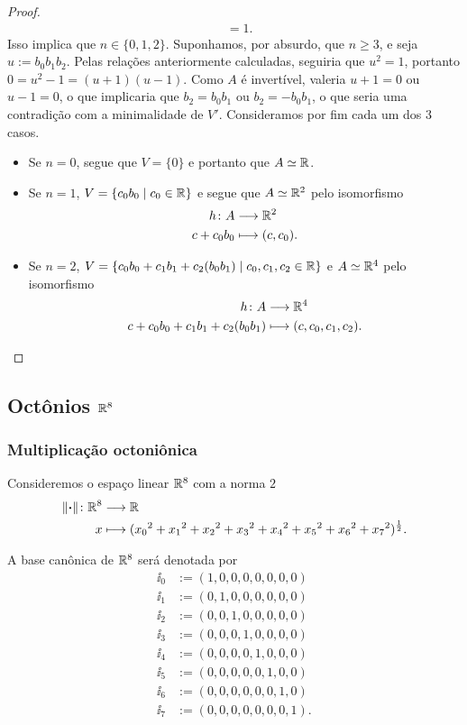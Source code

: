 \begin{proof}
\begin{align*}
		&= 1.
	\end{align*}
Isso implica que $n \in \{0,1,2\}$. Suponhamos, por absurdo, que $n\geq 3$, e seja $u := b_0b_1b_2$. Pelas relações anteriormente calculadas, seguiria que $u^2 = 1$, portanto $0 = u^2 - 1 = (u+1)(u-1)$. Como $A$ é invertível, valeria $u+1=0$ ou $u-1=0$, o que implicaria que $b_2=b_0b_1$ ou $b_2=-b_0b_1$, o que seria uma contradição com a minimalidade de $V'$.
Consideramos por fim cada um dos 3 casos.
\begin{itemize}
	\item Se $n=0$, segue que $V=\{0\}$ e portanto que $A \simeq \mathbb{R}$.
	\item Se $n=1$, $V=\left\{{c_0b_0}\;\middle\vert\;{c_0 \in \mathbb{R}}\right\}$ e segue que $A \simeq \mathbb{R}^2$ pelo isomorfismo
		\begin{align*}
		{h}\colon {A} &\longrightarrow {\mathbb{R}^2} \\{c+c_0b_0} &\longmapsto (c,c_0).
		\end{align*}
	\item Se $n=2$, $V=\left\{{c_0b_0 + c_1b_1 + c_2(b_0b_1)}\;\middle\vert\;{c_0,c_1,c_2 \in \mathbb{R}}\right\}$ e $A \simeq \mathbb{R}^4$ pelo isomorfismo
		\begin{align*}
		{h}\colon {A} &\longrightarrow {\mathbb{R}^4} \\{c+c_0b_0 + c_1b_1 + c_2(b_0b_1)} &\longmapsto (c,c_0,c_1,c_2).
		\end{align*}
\end{itemize}
\end{proof}





\subsection{Octônios \texorpdfstring{$\mathbb{R}^8$}{}}

\subsubsection{Multiplicação octoniônica}

Consideremos o espaço linear $\mathbb{R}^8$ com a norma $2$
	\begin{align*}
	{\left\Vert{\bm{\cdot}}\right\Vert}\colon {\mathbb{R}^8} &\longrightarrow {\mathbb{R}} \\{x} &\longmapsto ({x_0}^2+{x_1}^2+{x_2}^2+{x_3}^2+{x_4}^2+{x_5}^2+{x_6}^2+{x_7}^2)^{\frac{1}{2}}.
	\end{align*}

A base canônica de $\mathbb{R}^8$ será denotada por
	\begin{align*}
	\ii_0 &:= (1,0,0,0,0,0,0,0) \\
	\ii_1 &:= (0,1,0,0,0,0,0,0) \\
	\ii_2 &:= (0,0,1,0,0,0,0,0) \\
	\ii_3 &:= (0,0,0,1,0,0,0,0) \\
	\ii_4 &:= (0,0,0,0,1,0,0,0) \\
	\ii_5 &:= (0,0,0,0,0,1,0,0) \\
	\ii_6 &:= (0,0,0,0,0,0,1,0) \\
	\ii_7 &:= (0,0,0,0,0,0,0,1).
	\end{align*}

